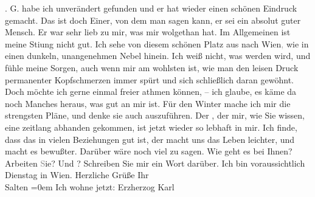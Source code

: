 \begin{ledgroupsized}[t]{13cm}
{{{               }}}\label{K_L03274-2h}. G. habe ich unverändert gefunden und
               er hat wieder einen schönen Eindruck gemacht. Das ist doch Einer, von dem man sagen
               kann, er sei ein absolut guter Mensch. Er war sehr lieb zu mir, was mir wolgethan
               hat. Im Allgemeinen ist meine Sti{\geminationm}ung nicht gut. Ich
               sehe von diesem schönen Platz aus nach Wien\textcolor{gray}{,} wie in einen dunkeln, unangenehmen Nebel hinein. Ich weiß nicht,
               was werden wird, und fühle meine Sorgen, auch wenn mir am wohlsten ist, wie man den
               leisen Druck permanenter Kopfschmerzen immer spürt und sich schließlich daran
               gewöhnt. Doch möchte ich gerne einmal freier athmen können, – ich glaube, {\pb}es käme da noch Manches
               heraus, was gut an mir ist. Für den Winter mache ich mir die strengsten Pläne, und
               denke sie auch auszuführen. Der \label{K_L03274-3v}\label{K_L03274-3h}, der mir, wie Sie wissen, eine zeitlang abhanden gekommen, ist jetzt wieder
               so lebhaft in mir. Ich finde, dass das in vielen Beziehungen gut ist, der macht uns
               das Leben leichter, und macht es bewußter. Darüber wäre noch viel zu sagen.\pend
           \pstart
           Wie geht es bei Ihnen? Arbeiten \textcolor{gray}{S}ie? Und \label{K_L03274-4v}\label{K_L03274-4h}?
               Schreiben Sie mir ein Wort darüber. Ich bin voraussichtlich Dienstag in Wien. Herzliche Grüße\pend
           \pstart
           Ihr{\\[\baselineskip]}\spacefill\mbox{Salten}\pend
           \leftskip=0em{}\pstart
           \noindent{}Ich wohne jetzt: Erzherzog Karl\pend
           
         
         \endnumbering{}\end{ledgroupsized}  \newcommand{\dateiname}{L03274}\newcommand{\titel}{Felix Salten an Arthur Schnitzler, 3. 9. [1897]}\newcommand{\editorInnen}{Martin Anton Müller und Laura Untner}
      